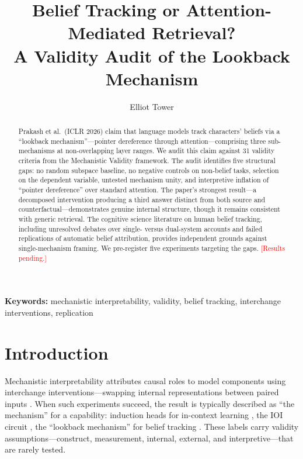 \documentclass[11pt]{article}
\title{Belief Tracking or Attention-Mediated Retrieval?\\A Validity Audit of the Lookback Mechanism}
\author{Elliot Tower}
\affil{Independent Researcher \\ \texttt{elliot@elliottower.ai}}
\begin{document}
\linenumbers
\maketitle

\begin{abstract}
Prakash et al.\ (ICLR 2026) claim that language models track characters' beliefs via a ``lookback mechanism''---pointer dereference through attention---comprising three sub-mechanisms at non-overlapping layer ranges. We audit this claim against 31 validity criteria from the Mechanistic Validity framework. The audit identifies five structural gaps: no random subspace baseline, no negative controls on non-belief tasks, selection on the dependent variable, untested mechanism unity, and interpretive inflation of ``pointer dereference'' over standard attention. The paper's strongest result---a decomposed intervention producing a third answer distinct from both source and counterfactual---demonstrates genuine internal structure, though it remains consistent with generic retrieval. The cognitive science literature on human belief tracking, including unresolved debates over single- versus dual-system accounts and failed replications of automatic belief attribution, provides independent grounds against single-mechanism framing. We pre-register five experiments targeting the gaps. \textcolor{red}{[Results pending.]}
\end{abstract}

\noindent\textbf{Keywords:} mechanistic interpretability, validity, belief tracking, interchange interventions, replication


\section{Introduction}
\label{sec:intro}

Mechanistic interpretability attributes causal roles to model components using interchange interventions---swapping internal representations between paired inputs \citep{geiger2021causal, vig2020investigating}. When such experiments succeed, the result is typically described as ``the mechanism'' for a capability: induction heads for in-context learning \citep{olsson2022context}, the IOI circuit \citep{wang2023interpretability}, the ``lookback mechanism'' for belief tracking \citep{prakash2025lookback}. These labels carry validity assumptions---construct, measurement, internal, external, and interpretive---that are rarely tested.
\end{document}
